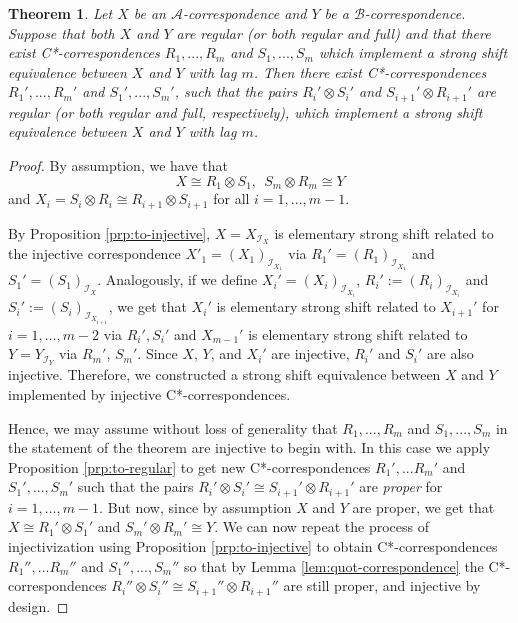 \documentclass[11pt, letterpaper,final]{amsart}
\newcommand{\A}{{\mathcal{A}}}
\newcommand{\B}{{\mathcal{B}}}
\newcommand{\I}{{\mathcal{I}}}
\newtheorem{thm}{Theorem}[section]
\theoremstyle{definition}
\begin{document}
\begin{thm} \label{thm:reg-reduction}
Let $X$ be an $\A$-correspondence and $Y$ be a $\B$-correspondence. Suppose that both $X$ and $Y$ are regular (or both regular and full) and that there exist C*-correspondences $R_1,...,R_m$ and $S_1,...,S_m$ which implement a strong shift equivalence between $X$ and $Y$ with lag $m$. Then there exist C*-correspondences $R_1',..., R_m'$ and $S_1',...,S_m'$, such that the pairs $R_i' \otimes S_i'$ and $S_{i+1}' \otimes R_{i+1}'$ are regular (or both regular and full, respectively), which implement a strong shift equivalence between $X$ and $Y$ with lag $m$.
\end{thm}

\begin{proof}
By assumption, we have that
$$
X \cong R_1 \otimes S_1, \ \ S_m \otimes R_m \cong Y
$$
and $X_i= S_i \otimes R_i \cong R_{i+1} \otimes S_{i+1}$ for all $i=1,...,m-1$.

By Proposition \ref{prp:to-injective}, $X = X_{\I_X}$ is elementary strong shift related to the injective correspondence $X'_1 = (X_1)_{\I_{X_1}}$ via $R_1'=(R_1)_{\I_{X_1}}$ and $S_1' = (S_1)_{\I_{X}}$.
Analogously, if we define $X_{i}'= (X_{i})_{\I_{X_i}}$, $R_i':=(R_i)_{\I_{X_i}}$ and $S_i':= (S_i)_{\I_{X_{i+1}}}$, we get that $X_i'$ is elementary strong shift related to $X_{i+1}'$ for $i=1,\dots, m-2$ via $R_i',S_i'$ and $X_{m-1}'$ is elementary strong shift related to $Y=Y_{\I_Y}$ via $R_m'$, $S_m'$.
Since $X$, $Y$, and $X_i'$ are injective, $R_i'$ and $S_i'$ are also injective.
Therefore, we constructed a strong shift equivalence between $X$ and $Y$ implemented by injective C*-correspondences.

Hence, we may assume without loss of generality that $R_1,...,R_m$ and $S_1,...,S_m$ in the statement of the theorem are injective to begin with. In this case we apply Proposition \ref{prp:to-regular} to get new C*-correspondences $R_1',...R_m'$ and $S_1',...,S_m'$ such that the pairs $R_i' \otimes S_i' \cong S_{i+1}' \otimes R_{i+1}'$ are \emph{proper} for $i=1,...,m-1$. But now, since by assumption $X$ and $Y$ are proper, we get that $X \cong R_1'\otimes S_1'$ and $S_m' \otimes R_m' \cong Y$. We can now repeat the process of injectivization using Proposition \ref{prp:to-injective} to obtain C*-correspondences $R_1'',...R_m''$ and $S_1'',...,S_m''$ so that by Lemma \ref{lem:quot-correspondence} the C*-correspondences $R_i'' \otimes S_i''\cong S_{i+1}'' \otimes R_{i+1}''$ are still proper, and injective by design.


\end{proof}
\end{document}
